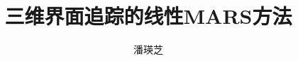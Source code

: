 \documentclass[a4paper]{report}
\begin{document}
	\begin{CJK*}{UTF8}{gkai}
		\CJKindent
 
 \makeatletter %
 \def\@cite#1#2{\textsuperscript{[{#1\if@tempswa , #2\fi}]}}
 \makeatother
 \newtheorem{thm}{{定理}}[chapter]
 \newtheorem{lem}[thm]{{引理}}
 \newtheorem{defn}[thm]{{定义}}
 \newtheorem{prop}[thm]{{命题}}
 \newtheorem{cor}[thm]{{推论}}
 \newtheorem{exm}{{例}}[chapter]
 \newtheorem{rem}[exm]{{注}}
 \newtheorem*{pro}{证明}
 
 \renewcommand{\bibname}{\centerline{参考文献}}
 \renewcommand{\tablename}{表}
 \renewcommand{\figurename}{图}
 

 \title{三维界面追踪的线性MARS方法}
 \author{潘瑛芝}
 \date{}
 \maketitle
 
  

  





  
  
  



%  
  
  
  
\end{CJK*}
\end{document}
